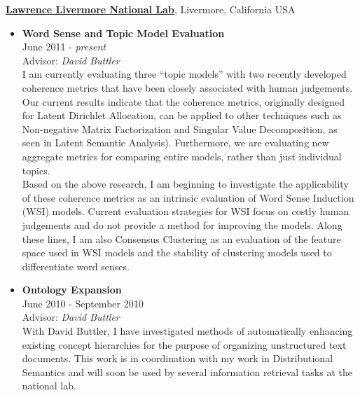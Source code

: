\documentclass[10pt]{article}
\newenvironment{outerlist}[1][\enskip\textbullet]%
        {\begin{itemize}[#1,leftmargin=*]}{\end{itemize}%
         \vspace{-.6\baselineskip}}
\begin{document}
\href{http://www.llnl.gov/}{\textbf{Lawrence Livermore National Lab}},
Livermore, California USA
\begin{outerlist}

\item[] \textbf{Word Sense and Topic Model Evaluation} \\
        June 2011 - \textit{present} \\
        Advisor: \textit{David Buttler} \\

        I am currently evaluating three ``topic models'' with two recently
        developed coherence metrics that have been closely associated with human
        judgements.  Our current results indicate that the coherence metrics,
        originally designed for Latent Dirichlet Allocation, can be applied to
        other techniques such as Non-negative Matrix Factorization and Singular
        Value Decomposition, as seen in Latent Semantic Analysis).  Furthermore,
        we are evaluating new aggregate metrics for comparing entire models,
        rather than just individual topics. \\

        Based on the above research, I am beginning to investigate the
        applicability of these coherence metrics as an intrinsic evaluation of
        Word Sense Induction (WSI) models.  Current evaluation strategies for
        WSI focus on costly human judgements and do not provide a method for
        improving the models.  Along these lines, I am also Consensus Clustering
        as an evaluation of the feature space used in WSI models and the
        stability of clustering models used to differentiate word senses. \\

\item[] \textbf{Ontology Expansion} \\
        June 2010 - September 2010 \\
        Advisor: \textit{David Buttler} \\

        With David Buttler, I have investigated methods of automatically
        enhancing existing concept hierarchies for the purpose of organizing
        unstructured text documents. This work is in coordination with my work
        in Distributional Semantics and will soon be used by several information
        retrieval tasks at the national lab. \\

\end{outerlist}
\end{document}
